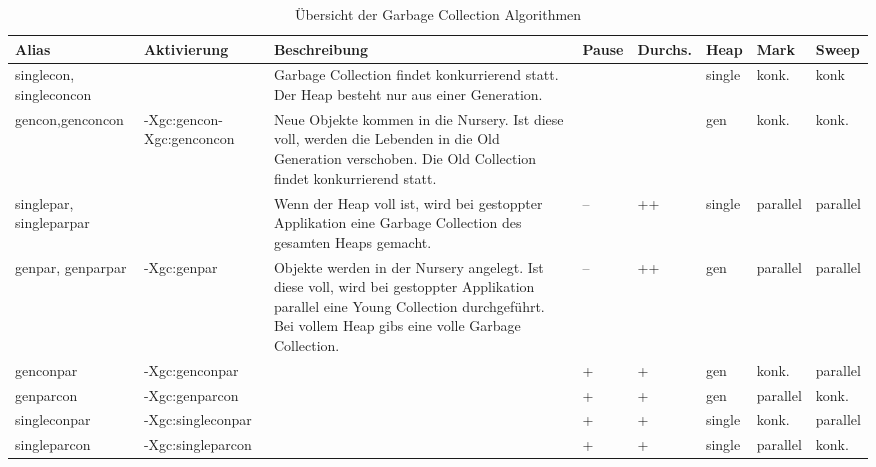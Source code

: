 \begin{landscape}
  \begin{longtable}{|p{2.1cm}|p{3cm}|p{5.5cm}|p{1cm}| p{1.3cm}|p{1cm}|p{1cm}|p{1.1cm}|}
    \caption{Übersicht der Garbage Collection Algorithmen}\\\hline
  \textbf{Alias} & \textbf{Aktivierung}& \textbf{Beschreibung} & \textbf{Pause} &\textbf{Durchs.} & \textbf{Heap} & \textbf{Mark} & \textbf{Sweep} \\\hline
  singlecon, singleconcon && Garbage Collection findet konkurrierend statt. Der Heap besteht nur aus einer Generation.&\center{++}&\center{--}& single & konk. & konk\\\hline

  gencon,\newline genconcon& -Xgc:gencon\newline-Xgc:genconcon &Neue Objekte kommen in die Nursery. Ist diese voll, werden die Lebenden in die Old Generation verschoben. Die Old Collection findet konkurrierend statt.&\center{++}& \center{--} & gen & konk. & konk.\\\hline	
 
  singlepar, \newline singleparpar& & Wenn der Heap voll ist, wird bei gestoppter Applikation eine Garbage Collection des gesamten Heaps gemacht. & -- & ++ & single & parallel & parallel \\\hline
  genpar, \newline genparpar& -Xgc:genpar & Objekte werden in der Nursery angelegt. Ist diese voll, wird bei gestoppter Applikation parallel eine Young Collection durchgeführt. Bei vollem Heap gibs eine volle Garbage Collection. & -- & ++ & gen& parallel & parallel \\\hline
  genconpar &-Xgc:genconpar&&+&+&gen& konk. & parallel \\\hline
  genparcon &-Xgc:genparcon&&+&+&gen& parallel & konk. \\\hline
  singleconpar &-Xgc:singleconpar&&+&+&single&konk. & parallel \\\hline
  singleparcon& -Xgc:singleparcon&&+&+&single&parallel & konk. \\\hline
  \end{longtable}
\end{landscape}


